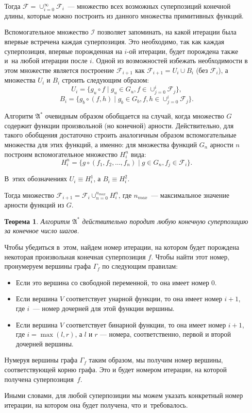 \documentclass[12pt,a4paper]{article}
\newtheorem{theorem}{Теорема}
\begin{document}
Тогда $\mathcal{F} = \cup_{i=0}^\infty \mathcal{F}_i$~--- множество всех
возможных суперпозиций конечной длины, которые можно построить из
данного множества примитивных функций.

Вспомогательное множество $\mathcal{I}$ позволяет запоминать, на какой
итерации была впервые встречена каждая суперпозиция. Это необходимо, так
как каждая суперпозиция, впервые порожденная на $i$-ой итерации, будет
порождена также и~на любой итерации после $i$. Одной из возможностей
избежать необходимости в этом множестве является построение
$\mathcal{F}_{i+1}$ как $\mathcal{F}_{i+1} = U_i \cup B_i$ (без
$\mathcal{F}_i$), а множества $U_i$ и $B_i$ строить следующим образом:
\[
  U_i = \{ g_u \circ f \mid g_u \in G_u, f \in \cup_{j=0}^{i} \mathcal{F}_j \},
\]
\[
  B_i = \{ g_b \circ (f, h) \mid g_b \in G_b, f, h \in \cup_{j=0}^{i} \mathcal{F}_j \}.
\]

Алгоритм $\mathfrak{A^*}$ очевидным образом обобщается на случай, когда
множество $G$ содержит функции произвольной (но конечной) арности.
Действительно, для такого обобщения достаточно строить аналогичным образом
вспомогательные множества для этих функций, а именно: для множества функций
$G_n$ арности $n$ построим вспомогательное множество $H_i^n$ вида:
\[
H_i^n = \{ g \circ (f_1, f_2, \dots, f_n) \mid g \in G_n, f_j \in \mathcal{F}_i \}.
\]

В~этих обозначениях $U_i \equiv H_i^1$, а $B_i \equiv H_i^2$.

Тогда множество $\mathcal{F}_{i+1} = \mathcal{F}_i \cup_{n=0}^{n_{max}} H_i^n$,
где $n_{max}$~--- максимальное значение арности функций из $G$.

\begin{theorem}
  Алгоритм $\mathfrak{A^*}$ действительно породит любую конечную суперпозицию
  за конечное число шагов.
\end{theorem}
\begin{Proof}
  Чтобы убедиться в~этом, найдем номер итерации, на котором будет порождена
  некоторая произвольная конечная суперпозиция $f$. Чтобы найти этот номер,
  пронумеруем вершины графа $\Gamma_f$ по следующим правилам:
  \begin{itemize}
	\item Если это вершина со свободной переменной, то она имеет номер $0$.
	\item Если вершина $V$ соответствует унарной функции, то она имеет номер
	  $i+1$, где $i$~--- номер дочерней для этой функции вершины.
	\item Если вершина $V$ соответствует бинарной функции, то она имеет номер
	  $i+1$, где $i = \max (l, r)$, а $l$ и $r$ --- номера, соответственно,
	  первой и второй дочерней вершины.
  \end{itemize}

  Нумеруя вершины графа $\Gamma_f$ таким образом, мы получим номер вершины,
  соответствующей корню графа. Это и будет номером итерации, на которой получена
  суперпозиция~$f$.
  
  Иными словами, для любой суперпозиции мы можем указать конкретный номер
  итерации, на котором она будет получена, что и~требовалось.
\end{Proof}
\end{document}
